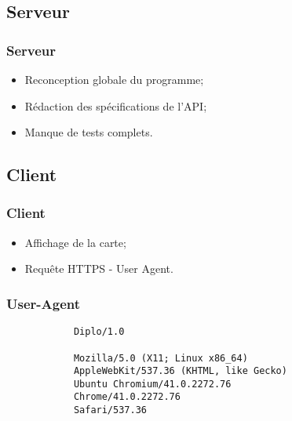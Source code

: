 \subsection{Serveur}
	\begin{frame}
		\frametitle{Serveur}
        \begin{itemize}
            \item Reconception globale du programme; \newline
            \item Rédaction des spécifications de l'API; \newline
            \item Manque de tests complets. \newline
        \end{itemize}
	\end{frame}

\subsection{Client}
	\begin{frame}
		\frametitle{Client}
		\begin{itemize}
			\item Affichage de la carte; \newline
			\item Requête HTTPS - User Agent.
		\end{itemize}
	\end{frame}
	\begin{frame}[fragile]
		\frametitle{User-Agent}
		\begin{verbatim}
			Diplo/1.0

			Mozilla/5.0 (X11; Linux x86_64) 
			AppleWebKit/537.36 (KHTML, like Gecko) 
			Ubuntu Chromium/41.0.2272.76 
			Chrome/41.0.2272.76 
			Safari/537.36
		\end{verbatim}
	\end{frame}
